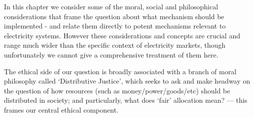 In this chapter we consider some of the moral, social and philosophical considerations that frame the question about what mechanism should be implemented - and relate them directly to potent mechanisms relevant to electricity systems.
However these considerations and concepts are crucial and range much wider than the specific context of electricity markets, though unfortunately we cannot give a comprehensive treatment of them here.

The ethical side of our question is broadly associated with a branch of moral philosophy called `Distributive Justice', which seeks to ask and make headway on the question of how resources (such as money/power/goods/etc) should be distributed in society; and particularly, what does `fair' allocation mean? --- this frames our central ethical component.

